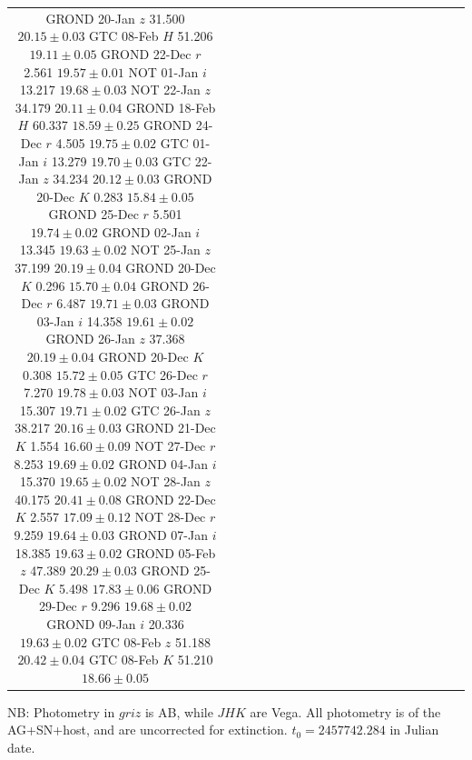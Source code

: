 \documentclass[traditabstract,longauth]{aa}
\begin{document}
\begin{appendix}
\begin{landscape}
\begin{table}
\begin{tabular}{ccccc|ccccc|ccccc|ccccc}
GROND		20-Jan		$z$		31.500		$	20.15	\pm	0.03	$		
GTC		08-Feb		$H$		51.206		$	19.11	\pm	0.05	$	
GROND		22-Dec		$r$		2.561		$	19.57	\pm	0.01	$		
NOT		01-Jan		$i$		13.217		$	19.68	\pm	0.03	$		
NOT		22-Jan		$z$		34.179		$	20.11	\pm	0.04	$		
GROND		18-Feb		$H$		60.337		$	18.59	\pm	0.25	$	
GROND		24-Dec		$r$		4.505		$	19.75	\pm	0.02	$		
GTC		01-Jan		$i$		13.279		$	19.70	\pm	0.03	$		
GTC		22-Jan		$z$		34.234		$	20.12	\pm	0.03	$		
GROND		20-Dec		$K$		0.283		$	15.84	\pm	0.05	$	
GROND		25-Dec		$r$		5.501		$	19.74	\pm	0.02	$		
GROND		02-Jan		$i$		13.345		$	19.63	\pm	0.02	$		
NOT		25-Jan		$z$		37.199		$	20.19	\pm	0.04	$		
GROND		20-Dec		$K$		0.296		$	15.70	\pm	0.04	$	
GROND		26-Dec		$r$		6.487		$	19.71	\pm	0.03	$		
GROND		03-Jan		$i$		14.358		$	19.61	\pm	0.02	$		
GROND		26-Jan		$z$		37.368		$	20.19	\pm	0.04	$		
GROND		20-Dec		$K$		0.308		$	15.72	\pm	0.05	$	
GTC		26-Dec		$r$		7.270		$	19.78	\pm	0.03	$		
NOT		03-Jan		$i$		15.307		$	19.71	\pm	0.02	$		
GTC		26-Jan		$z$		38.217		$	20.16	\pm	0.03	$		
GROND		21-Dec		$K$		1.554		$	16.60	\pm	0.09	$	
NOT		27-Dec		$r$		8.253		$	19.69	\pm	0.02	$		
GROND		04-Jan		$i$		15.370		$	19.65	\pm	0.02	$		
NOT		28-Jan		$z$		40.175		$	20.41	\pm	0.08	$		
GROND		22-Dec		$K$		2.557		$	17.09	\pm	0.12	$	
NOT		28-Dec		$r$		9.259		$	19.64	\pm	0.03	$		
GROND		07-Jan		$i$		18.385		$	19.63	\pm	0.02	$		
GROND		05-Feb		$z$		47.389		$	20.29	\pm	0.03	$		
GROND		25-Dec		$K$		5.498		$	17.83	\pm	0.06	$	
GROND		29-Dec		$r$		9.296		$	19.68	\pm	0.02	$		
GROND		09-Jan		$i$		20.336		$	19.63	\pm	0.02	$		
GTC		08-Feb		$z$		51.188		$	20.42	\pm	0.04	$	
GTC		08-Feb		$K$		51.210		$	18.66	\pm	0.05	$	

\hline													
\end{tabular}
\begin{flushleft}
NB: Photometry in $griz$ is AB, while $JHK$ are Vega.  All photometry is of the AG+SN+host, and are uncorrected for extinction.
$t_0 = 2457742.284$ in Julian date.
\end{flushleft}
\end{table}

\end{landscape}


\end{appendix}



\end{document}
